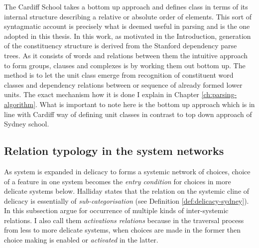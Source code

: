 The Cardiff School takes a bottom up approach and defines class in terms of its internal structure describing a relative or absolute order of elements. This sort of syntagmatic account is precisely what is deemed useful in parsing and is the one adopted in this thesis. 
In this work, as motivated in the Introduction, generation of the constituency structure is derived from the Stanford dependency parse trees. As it consists of words and relations between them the intuitive approach to form groups, clauses and complexes is by working them out bottom up. 
The method is to let the unit class emerge from recognition of constituent word classes and dependency relations between or sequence of already formed lower units. The exact mechanism how it is done I explain in Chapter \ref{ch:parsing-algorithm}. What is important to note here is the bottom up approach which is in line with Cardiff way of defining unit classes in contrast to top down approach of Sydney school.


\subsection{Relation typology in the system networks}

As system is expanded in delicacy to forms a systemic network of choices, choice of a feature in one system becomes the \textit{entry condition} for choices in more delicate systems below. Halliday states that the relation on the systemic cline of delicacy is essentially of \textit{sub-categorisation} (see Definition \ref{def:delicacy-sydney}). In this subsection argue for occurrence of multiple kinds of inter-systemic relations. I also call them \textit{activations relations} because in the traversal process from less to more delicate systems, when choices are made in the former then choice making is enabled or \textit{activated} in the latter.

